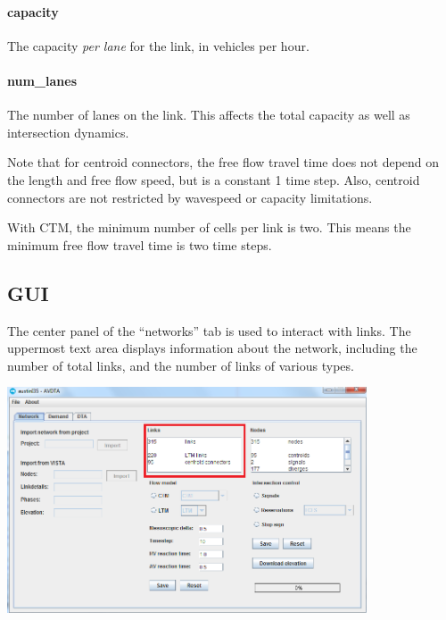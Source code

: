 \paragraph*{capacity} The capacity \textit{per lane} for the link, in vehicles per hour.
\paragraph*{num\_lanes} The number of lanes on the link. This affects the total capacity as well as intersection dynamics.

Note that for centroid connectors, the free flow travel time does not depend on the length and free flow speed, but is a constant 1 time step. Also, centroid connectors are not restricted by wavespeed or capacity limitations. 

With CTM, the minimum number of cells per link is two. This means the minimum free flow travel time is two time steps.

\subsection{GUI}

The center panel of the ``networks'' tab is used to interact with links. The uppermost text area displays information about the network, including the number of total links, and the number of links of various types.
\begin{center}
\includegraphics[width=0.8\textwidth]{images/links1.png}
\end{center}

